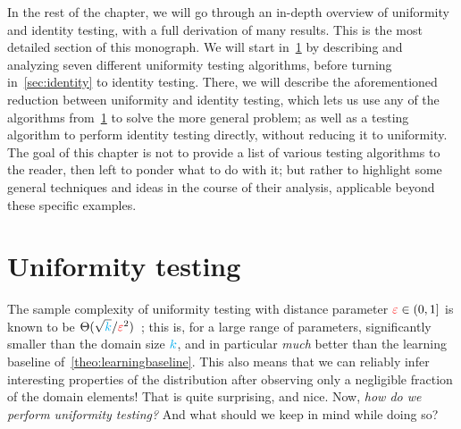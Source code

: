 In the rest of the chapter, we will go through an in-depth overview of uniformity and identity testing, with a full derivation of many results. This is the most detailed section of this monograph. We will start in~\cref{sec:uniformity} by describing and analyzing seven different uniformity testing algorithms, before turning in~\cref{sec:identity} to identity testing. There, we will describe the aforementioned reduction between uniformity and identity testing, which lets us use any of the algorithms from~\cref{sec:uniformity} to solve the more general problem; as well as a testing algorithm to perform identity testing directly, without reducing it to uniformity. The goal of this chapter is not to provide a list of various testing algorithms to the reader, then left to ponder what to do with it; but rather to highlight some general techniques and ideas in the course of their analysis, applicable beyond these specific examples.


\section{Uniformity testing}
  \label{sec:uniformity}

The sample complexity of uniformity testing with distance parameter $\textcolor{red}{\varepsilon}\in(0,1]$ is known to be $\Theta(\sqrt{{\textcolor{cyan}{k}}}/\textcolor{red}{\varepsilon}^2)$~\citep{Paninski08}; this is, for a large range of parameters, significantly smaller than the domain size ${\textcolor{cyan}{k}}$, and in particular \emph{much} better than the learning baseline of~\cref{theo:learningbaseline}. This also means that we can reliably infer interesting properties of the distribution after observing only a negligible fraction of the domain elements! That is quite surprising, and nice. Now, \emph{how do we perform uniformity testing?}  And what should we keep in mind while doing so?


